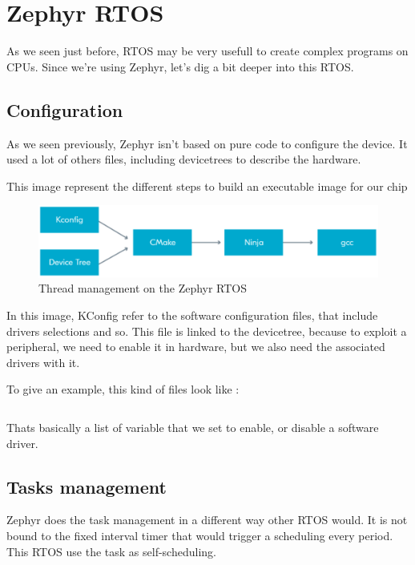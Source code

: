 \section{Zephyr RTOS}
As we seen just before, RTOS may be very usefull to create complex programs on CPUs.
Since we're using Zephyr, let's dig a bit deeper into this RTOS.

\subsection{Configuration}
As we seen previously, Zephyr isn't based on pure code to configure the device. It used 
a lot of others files, including devicetrees to describe the hardware.

This image represent the different steps to build an executable image for our chip
\begin{figure}[!hbt]
    \centering
    \includegraphics[width=\SchematicWidth]{images/Zephyr/ZephyrBuild.eps}
    \caption{Thread management on the Zephyr RTOS}
\end{figure}
\FloatBarrier

In this image, KConfig refer to the software configuration files, that include 
drivers selections and so. This file is linked to the devicetree, because to 
exploit a peripheral, we need to enable it in hardware, but we also need the associated
drivers with it.

To give an example, this kind of files look like : 
\inputminted[linenos, firstline=32, lastline=70]{kconfig}{data/code/cfg/prj.conf}

Thats basically a list of variable that we set to enable, or disable a software driver.

\subsection{Tasks management}
Zephyr does the task management in a different way other RTOS would. It is not bound to 
the fixed interval timer that would trigger a scheduling every period. This RTOS use the
task as self-scheduling.


